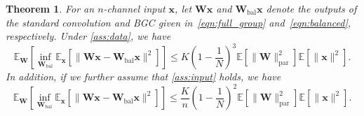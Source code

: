 \documentclass[10pt,a4paper]{amsart}
\numberwithin{equation}{section}
\newtheorem{theorem}{Theorem}[section]
\theoremstyle{remark}
\newcommand\bW{\mathbf{W}}
\newcommand\bx{\mathbf{x}}
\newcommand\bbE{\mathbb{E}}
\newcommand\bal{\mathrm{bal}}
\newcommand\param{\mathrm{par}}
\begin{document}
\begin{theorem}
  \label{thm:2}
  For an $n$-channel input $\bx$, let $\bW \bx$ and $\bW_{\bal} \bx$ denote the outputs of the standard convolution and BGC given in~\eqref{eqn:full_group} and~\eqref{eqn:balanced}, respectively.
  Under \cref{ass:data}, we have
  \begin{equation*}
  \bbE_{\bW} \left[ \inf_{\bW_{\bal}} \bbE_{\bx} \left[ \| \bW \bx - \bW_{\bal} \bx \|^2 \right] \right]
  \leq K \left( 1 - \frac{1}{N} \right)^3 \bbE \left[ \| \bW \|_{\param}^2 \right] \bbE \left[ \| \bx \|^2 \right].
  \end{equation*}
  In addition, if we further assume that \cref{ass:input} holds, we have
  \begin{equation*}
  \bbE_{\bW} \left[ \inf_{\bW_{\bal}} \bbE_{\bx} \left[ \| \bW \bx - \bW_{\bal} \bx \|^2 \right] \right]
  \leq \frac{K}{n} \left( 1 - \frac{1}{N} \right)^{2} \bbE \left[ \| \bW \|_{\param}^2 \right] \bbE \left[ \| \bx \|^2 \right].
  \end{equation*}
\end{theorem}
\end{document}

